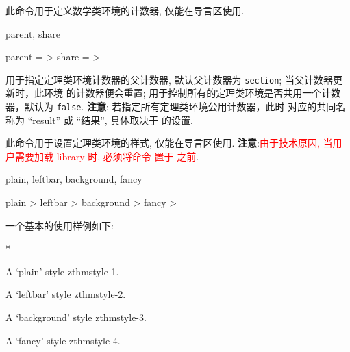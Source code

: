 \begin{function}[updated=2025-04-25]{\zthmcnt}
  \begin{syntax}
  \end{syntax}
  此命令用于定义数学类环境的计数器, 仅能在导言区使用.
\end{function}


\begin{keyval}[parent=..]{parent, share}
  \begin{syntax}
    parent = >
    share  = >
  \end{syntax}
   用于指定定理类环境计数器的父计数器, 默认父计数器为 \texttt{section}; 当父计数器更新时，此环境
  的计数器便会重置;  用于控制所有的定理类环境是否共用一个计数器，默认为 \texttt{false}. \textbf{注意}:%
  若指定所有定理类环境公用计数器，此时  对应的共同名称为 ``result'' 或 ``结果'', 具体取决于  的设置.
\end{keyval}


\begin{function}[updated=2025-04-25]{\zthmstyle}
  \begin{syntax}
  \end{syntax}
  此命令用于设置定理类环境的样式, 仅能在导言区使用. \textbf{注意}:\textcolor{red}{\sffamily 由于技术原因, 当用户需要加载
   library 时, 必须将命令 \texttt{} 置于  之前}. 
\end{function}


\begin{keyval}[parent=ztex/thm/style]{plain, leftbar, background, fancy}
  \begin{syntax}
    plain > \nval
    leftbar > \nval
    background > \nval
    fancy > \nval
  \end{syntax}
\end{keyval}
一个基本的使用样例如下\zchcmd:
\begin{DocExample}*
  \begin{theorem}[zthmstyle-1]
    A `plain' style zthmstyle-1.
  \end{theorem}
  \begin{theorem}[zthmstyle-2]
    A `leftbar' style zthmstyle-2.
  \end{theorem}
  \begin{theorem}[zthmstyle-3]
    A `background' style zthmstyle-3.
  \end{theorem}
  \begin{theorem}[zthmstyle-4]
    A `fancy' style zthmstyle-4.
  \end{theorem}
\end{DocExample}



